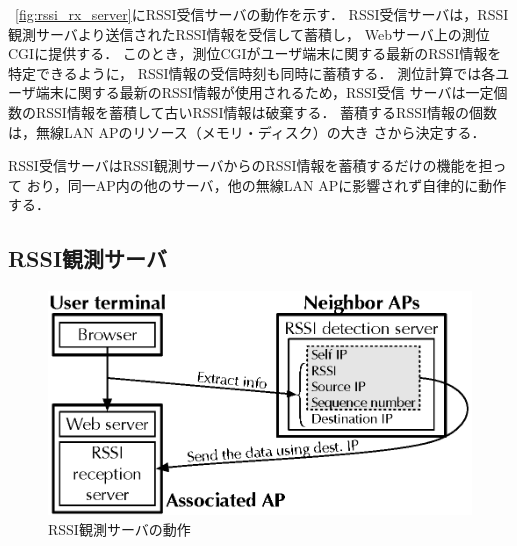 \documentclass[technicalreport]{ieicej}
\begin{document}
\figurename~\ref{fig:rssi_rx_server}にRSSI受信サーバの動作を示す．
RSSI受信サーバは，RSSI観測サーバより送信されたRSSI情報を受信して蓄積し，
Webサーバ上の測位CGIに提供する．
このとき，測位CGIがユーザ端末に関する最新のRSSI情報を特定できるように，
RSSI情報の受信時刻も同時に蓄積する．
測位計算では各ユーザ端末に関する最新のRSSI情報が使用されるため，RSSI受信
サーバは一定個数のRSSI情報を蓄積して古いRSSI情報は破棄する．
蓄積するRSSI情報の個数は，無線LAN APのリソース（メモリ・ディスク）の大き
さから決定する．

RSSI受信サーバはRSSI観測サーバからのRSSI情報を蓄積するだけの機能を担って
おり，同一AP内の他のサーバ，他の無線LAN APに影響されず自律的に動作する．

\subsection{RSSI観測サーバ}
\label{ssec:rssi_detect}

\begin{figure}[bt]
 \centering
 \includegraphics[width=0.9\columnwidth]{figure/rssi_detect_server.eps}
 \caption{RSSI観測サーバの動作}
 \label{fig:rssi_detect_server}
\end{figure}
\end{document}

